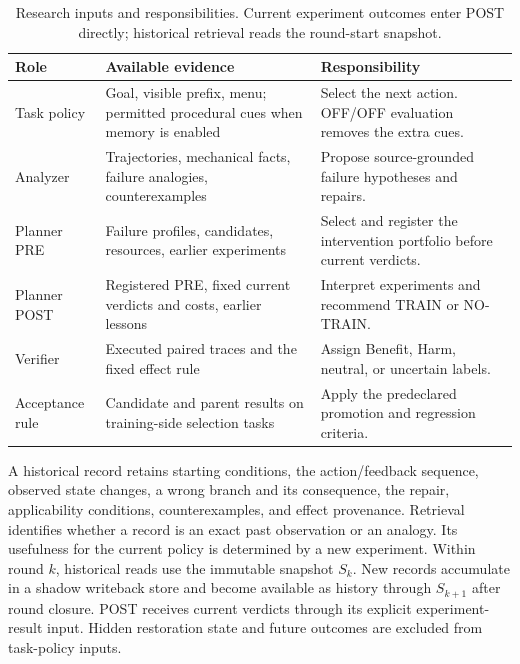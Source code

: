\begin{table}[htbp]
\caption{Research inputs and responsibilities. Current experiment outcomes
enter POST directly; historical retrieval reads the round-start snapshot.}
\centering
\begin{tabularx}{\linewidth}{L{0.82in}>{\raggedright\arraybackslash}X>{\raggedright\arraybackslash}X}
\toprule
Role & Available evidence & Responsibility\\\midrule
Task policy & Goal, visible prefix, menu; permitted procedural cues when memory is enabled & Select the next action. OFF/OFF evaluation removes the extra cues.\\
Analyzer & Trajectories, mechanical facts, failure analogies, counterexamples & Propose source-grounded failure hypotheses and repairs.\\
Planner PRE & Failure profiles, candidates, resources, earlier experiments & Select and register the intervention portfolio before current verdicts.\\
Planner POST & Registered PRE, fixed current verdicts and costs, earlier lessons & Interpret experiments and recommend TRAIN or NO-TRAIN.\\
Verifier & Executed paired traces and the fixed effect rule & Assign Benefit, Harm, neutral, or uncertain labels.\\
Acceptance rule & Candidate and parent results on training-side selection tasks & Apply the predeclared promotion and regression criteria.\\
\bottomrule
\end{tabularx}
\end{table}

A historical record retains starting conditions, the action/feedback sequence,
observed state changes, a wrong branch and its consequence, the repair,
applicability conditions, counterexamples, and effect provenance. Retrieval
identifies whether a record is an exact past observation or an analogy. Its
usefulness for the current policy is determined by a new experiment.
Within round $k$, historical reads use the immutable snapshot $S_k$.
New records accumulate in a shadow writeback store and become available as
history through $S_{k+1}$ after round closure. POST receives current verdicts
through its explicit experiment-result input. Hidden restoration state and
future outcomes are excluded from task-policy inputs.


